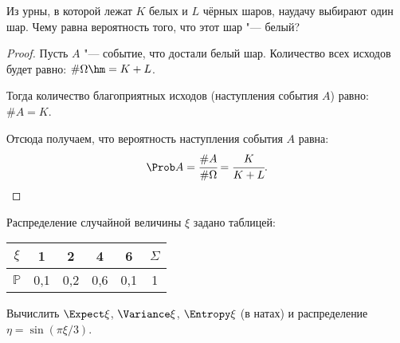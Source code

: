
\renewcommand*{\proofname}{Решение}

\begin{problem}
	Из урны, в которой лежат $ K $ белых и $ L $ чёрных шаров, наудачу выбирают один шар. Чему равна вероятность того, что этот шар "--- белый?
\end{problem}

\begin{proof}
	Пусть $ A $ "--- событие, что достали белый шар.
	Количество всех исходов будет равно: $ \#\Omega \hm= K + L $.
	
	Тогда количество благоприятных исходов (наступления события $ A $) равно: $ \#A = K $.
	
	Отсюда получаем, что вероятность наступления события $ A $ равна:
	\[ \Prob A = \cfrac{\#A}{\#\Omega} = \cfrac{K}{K + L}. \]
\end{proof}

\begin{problem}
	Распределение случайной величины $ \xi $ задано таблицей:
	\begin{center}
		\begin{tabular}{|c|c|c|c|c|c|}
		\hline
		$ \xi $ & 1 & 2 & 4 & 6 & $ \Sigma $ \\
		\hline
		$ \mathbb{P} $ & 0,1 & 0,2 & 0,6 & 0,1 & 1 \\
		\hline
		\end{tabular}
	\end{center}
	Вычислить $ \Expect\xi $, $ \Variance\xi $, $ \Entropy\xi $ (в натах) и распределение $ \eta = \sin(\pi\xi/3) $.
\end{problem}

